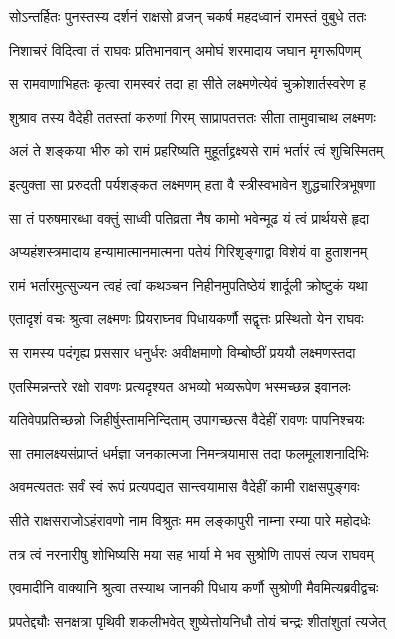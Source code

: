 \twolineshloka
{सोऽन्तर्हितः पुनस्तस्य दर्शनं राक्षसो व्रजन्}
{चकर्ष महदध्वानं रामस्तं वुबुधे ततः}


\twolineshloka
{निशाचरं विदित्वा तं राघवः प्रतिभानवान्}
{अमोघं शरमादाय जघान मृगरूपिणम्}


\twolineshloka
{स रामवाणाभिहतः कृत्वा रामस्वरं तदा}
{हा सीते लक्ष्मणेत्येवं चुक्रोशार्तस्वरेण ह}


\twolineshloka
{शुश्राव तस्य वैदेही ततस्तां करुणां गिरम्}
{साप्रापतत्ततः सीता तामुवाचाथ लक्ष्मणः}


\twolineshloka
{अलं ते शङ्कया भीरु को रामं प्रहरिष्यति}
{मुहूर्ताद्द्रक्ष्यसे रामं भर्तारं त्वं शुचिस्मितम्}


\twolineshloka
{इत्युक्ता सा प्ररुदती पर्यशङ्कत लक्ष्मणम्}
{हता वै स्त्रीस्वभावेन शुद्धचारित्रभूषणा}


\twolineshloka
{सा तं परुषमारब्धा वक्तुं साध्वी पतिव्रता}
{नैष कामो भवेन्मूढ यं त्वं प्रार्थयसे हृदा}


\twolineshloka
{अप्यहंशस्त्रमादाय हन्यामात्मानमात्मना}
{पतेयं गिरिशृङ्गाद्वा विशेयं वा हुताशनम्}


\twolineshloka
{रामं भर्तारमुत्सुज्यन त्वहं त्वां कथञ्चन}
{निहीनमुपतिष्ठेयं शार्दूली क्रोष्टुकं यथा}


\twolineshloka
{एतादृशं वचः श्रुत्वा लक्ष्मणः प्रियराघ्नव}
{पिधायकर्णौ सद्वृत्तः प्रस्थितो येन राघवः}


\twolineshloka
{स रामस्य पदंगृह्य प्रससार धनुर्धरः}
{अवीक्षमाणो विम्बोष्ठीं प्रययौ लक्ष्मणस्तदा}


\twolineshloka
{एतस्मिन्नन्तरे रक्षो रावणः प्रत्यदृश्यत}
{अभव्यो भव्यरूपेण भस्मच्छन्न इवानलः}


\twolineshloka
{यतिवेपप्रतिच्छन्नो जिहीर्षुस्तामनिन्दिताम्}
{उपागच्छत्स वैदेहीं रावणः पापनिश्चयः}


\twolineshloka
{सा तमालक्ष्यसंप्राप्तं धर्मज्ञा जनकात्मजा}
{निमन्त्रयामास तदा फलमूलाशनादिभिः}


\twolineshloka
{अवमत्यततः सर्वं स्वं रूपं प्रत्यपद्यत}
{सान्त्वयामास वैदेहीं कामी राक्षसपुङ्गवः}


\twolineshloka
{सीते राक्षसराजोऽहंरावणो नाम विश्रुतः}
{मम लङ्कापुरी नाम्ना रम्या पारे महोदधेः}


\twolineshloka
{तत्र त्वं नरनारीषु शोभिष्यसि मया सह}
{भार्या मे भव सुश्रोणि तापसं त्यज राघवम्}


\twolineshloka
{एवमादीनि वाक्यानि श्रुत्वा तस्याथ जानकी}
{पिधाय कर्णौ सुश्रोणी मैवमित्यब्रवीद्वचः}


\twolineshloka
{प्रपतेद्द्यौः सनक्षत्रा पृथिवी शकलीभवेत्}
{शुष्येत्तोयनिधौ तोयं चन्द्रः शीतांशुतां त्यजेत्}


